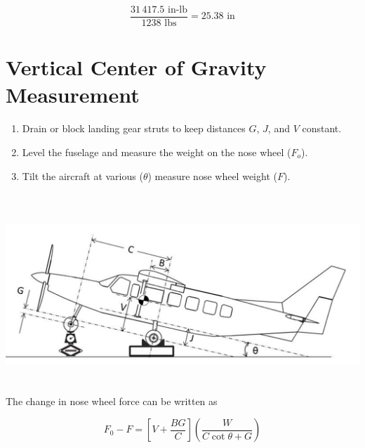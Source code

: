 \documentclass[
]{book}
\providecommand{\tightlist}{%
  \setlength{\itemsep}{0pt}\setlength{\parskip}{0pt}}
\begin{document}
\[\frac{31\,417.5 \text{ in-lb}}{1238 \text{ lbs}} = 25.38 \text{ in} \]

\hypertarget{vertical-center-of-gravity-measurement}{%
\section{Vertical Center of Gravity Measurement}\label{vertical-center-of-gravity-measurement}}

\begin{enumerate}
\def\labelenumi{\arabic{enumi}.}
\tightlist
\item
  Drain or block landing gear struts to keep distances \(G\), \(J\), and \(V\) constant.
\item
  Level the fuselage and measure the weight on the nose wheel (\(F_o\)).
\item
  Tilt the aircraft at various (\(\theta\)) measure nose wheel weight (\(F\)).
\end{enumerate}

~\includegraphics[width=6.5in,height=2.58542in]{media/07/image7.png}

The change in nose wheel force can be written as

\[ F_0 - F = \left[ V + \frac{B G}{C} \right] \left( \frac{W}{C \cot \theta + G}  \right)\]
\end{document}
